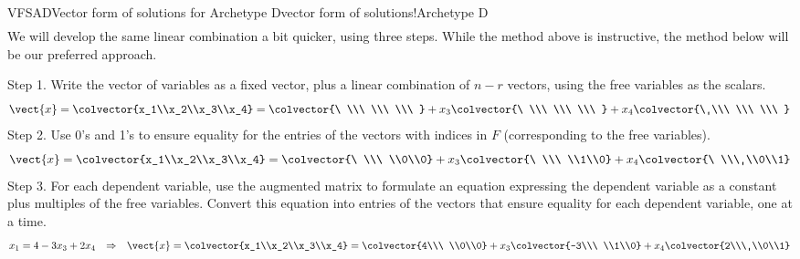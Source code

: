 \begin{example}{VFSAD}{Vector form of solutions for Archetype D}{vector form of solutions!Archetype D}
\begin{align*}
%
\end{align*}
%
We will develop the same linear combination a bit quicker, using three steps.  While the method above is instructive, the method below will be our preferred approach.\par
%
Step 1.  Write the vector of variables as a fixed vector, plus a linear combination of $n-r$ vectors, using the free variables as the scalars.
%
\begin{equation*}
\vect{x}=\colvector{x_1\\x_2\\x_3\\x_4}=
\colvector{\ \\\ \\\ \\\ }+x_3\colvector{\ \\\ \\\ \\\ }+x_4\colvector{\ \\\ \\\ \\\ }
\end{equation*}
%
Step 2.  Use 0's and 1's to ensure equality for the  entries of the vectors with indices in $F$ (corresponding to the free variables).
%
\begin{equation*}
\vect{x}=\colvector{x_1\\x_2\\x_3\\x_4}=
\colvector{\ \\\ \\0\\0}+x_3\colvector{\ \\\ \\1\\0}+x_4\colvector{\ \\\ \\0\\1}
\end{equation*}
%
Step 3.  For each dependent variable, use the augmented matrix to formulate an equation expressing the dependent variable as a constant plus multiples of the free variables.  Convert this equation into entries of the vectors that ensure equality for each dependent variable, one at a time.
%
\begin{align*}
x_1=4-3x_3+2x_4&&\Rightarrow&&
\vect{x}=\colvector{x_1\\x_2\\x_3\\x_4}=
\colvector{4\\\ \\0\\0}+x_3\colvector{-3\\\ \\1\\0}+x_4\colvector{2\\\ \\0\\1}\\

\end{align*}
\end{example}
